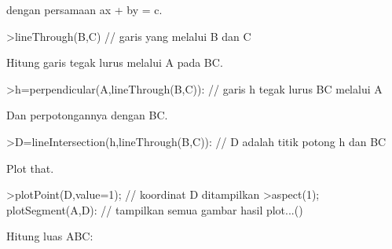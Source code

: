 \documentclass[12pt,Times new roman,letterpaper]{book}
\begin{document}
\begin{eulernootebook}
\begin{eulercomment}
\begin{eulercomment}
\begin{eulernootebook}
\begin{eulercomment}
\begin{eulercomment}
\begin{eulercomment}
\begin{eulercomment}
\begin{eulercomment}
\begin{eulercomment}
\begin{eulernotebook}
\begin{eulercomment}
\begin{eulercomment}
dengan persamaan ax + by = c.
\end{eulercomment}
\begin{eulerprompt}
>lineThrough(B,C) // garis yang melalui B dan C
\end{eulerprompt}
\begin{euleroutput}
  [-1,  2,  2]
\end{euleroutput}
\begin{eulercomment}
Hitung garis tegak lurus melalui A pada BC.
\end{eulercomment}
\begin{eulerprompt}
>h=perpendicular(A,lineThrough(B,C)): // garis h tegak lurus BC melalui A
\end{eulerprompt}
\begin{eulercomment}
Dan perpotongannya dengan BC.
\end{eulercomment}
\begin{eulerprompt}
>D=lineIntersection(h,lineThrough(B,C)): // D adalah titik potong h dan BC
\end{eulerprompt}
\begin{eulercomment}
Plot that.
\end{eulercomment}
\begin{eulerprompt}
>plotPoint(D,value=1); // koordinat D ditampilkan
>aspect(1); plotSegment(A,D): // tampilkan semua gambar hasil plot...()
\end{eulerprompt}
\begin{eulercomment}
Hitung luas ABC:


\end{eulercomment}
\end{eulercomment}
\end{eulernotebook}
\end{eulercomment}
\end{eulercomment}
\end{eulercomment}
\end{eulercomment}
\end{eulercomment}
\end{eulercomment}
\end{eulernootebook}
\end{eulercomment}
\end{eulercomment}
\end{eulernootebook}
\end{document}
